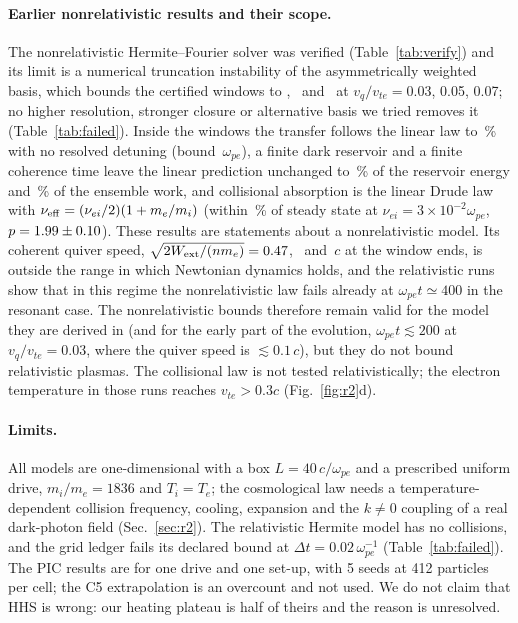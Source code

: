\documentclass[aps,pre,reprint,floatfix,amsmath,amssymb,nofootinbib,superscriptaddress]{revtex4-2}
\newcommand{\vq}{v_q/v_{te}}
\newcommand{\wpe}{\omega_{pe}}
\newcommand{\Wext}{W_{\rm ext}}
\begin{document}
\paragraph*{Earlier nonrelativistic results and their scope.} The nonrelativistic Hermite--Fourier solver was verified (Table~\ref{tab:verify}) and its limit is a numerical truncation instability of the asymmetrically weighted basis, which bounds the certified windows to \winA, \winB\ and \winC\ at $\vq=0.03$, 0.05, 0.07; no higher resolution, stronger closure or alternative basis we tried removes it (Table~\ref{tab:failed}). Inside the windows the transfer follows the linear law to \rnlBound\,\% with no resolved detuning (bound \rnlDw\,$\wpe$), a finite dark reservoir and a finite coherence time leave the linear prediction unchanged to \rnlResOZ\,\% of the reservoir energy and \rnlRbOZZ\,\% of the ensemble work, and collisional absorption is the linear Drude law with $\nu_{\rm eff}=(\nu_{ei}/2)(1+m_e/m_i)$ (within \rtwoPss\,\% of steady state at $\nu_{ei}=3\times10^{-2}\wpe$, $p=1.99\pm0.10$). These results are statements about a nonrelativistic model. Its coherent quiver speed, $\sqrt{2\Wext/(nm_e)}=\quivA$, \quivB\ and \quivC$\,c$ at the window ends, is outside the range in which Newtonian dynamics holds, and the relativistic runs show that in this regime the nonrelativistic law fails already at $\wpe t\simeq400$ in the resonant case. The nonrelativistic bounds therefore remain valid for the model they are derived in (and for the early part of the evolution, $\wpe t\lesssim200$ at $\vq=0.03$, where the quiver speed is $\lesssim0.1\,c$), but they do not bound relativistic plasmas. The collisional law is not tested relativistically; the electron temperature in those runs reaches $v_{te}>0.3c$ (Fig.~\ref{fig:r2}d).

\paragraph*{Limits.} All models are one-dimensional with a box $L=40\,c/\wpe$ and a prescribed uniform drive, $m_i/m_e=1836$ and $T_i=T_e$; the cosmological law needs a temperature-dependent collision frequency, cooling, expansion and the $k\ne0$ coupling of a real dark-photon field (Sec.~\ref{sec:r2}). The relativistic Hermite model has no collisions, and the grid ledger fails its declared bound at $\Delta t=0.02\,\wpe^{-1}$ (Table~\ref{tab:failed}). The PIC results are for one drive and one set-up, with 5 seeds at 412 particles per cell; the C5 extrapolation is an overcount and not used. We do not claim that HHS is wrong: our heating plateau is half of theirs and the reason is unresolved.
\end{document}

